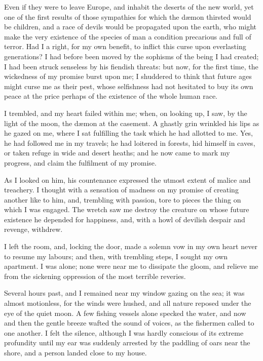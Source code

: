 Even if they were to leave Europe,
and inhabit the deserts of the new
world, yet one of the first results of
those sympathies for which the dæmon
thirsted would be children, and a race
of devils would be propagated upon the
earth, who might make the very existence
of the species of man a condition
precarious and full of terror. Had
I a right, for my own benefit, to inflict
this curse upon everlasting generations?
I had before been moved
by the sophisms of the being I had
created; I had been struck senseless
by his fiendish threats: but now, for
the first time, the wickedness of my
promise burst upon me; I shuddered
to think that future ages might curse
me as their pest, whose selfishness had
not hesitated to buy its own peace at
the price perhaps of the existence of
the whole human race.

I trembled, and my heart failed within
me; when, on looking up, I saw, by
the light of the moon, the dæmon at
the casement. A ghastly grin wrinkled
his lips as he gazed on me, where I sat
fulfilling the task which he had allotted
to me. Yes, he had followed me in my
travels; he had loitered in forests, hid
himself in caves, or taken refuge in
wide and desert heaths; and he now
came to mark my progress, and claim
the fulfilment of my promise.

As I looked on him, his countenance
expressed the utmost extent of malice
and treachery. I thought with a sensation
of madness on my promise of
creating another like to him, and, trembling
with passion, tore to pieces the
thing on which I was engaged. The
wretch saw me destroy the creature on
whose future existence he depended for
happiness, and, with a howl of devilish
despair and revenge, withdrew.

I left the room, and, locking the
door, made a solemn vow in my own
heart never to resume my labours; and
then, with trembling steps, I sought my
own apartment. I was alone; none
were near me to dissipate the gloom,
and relieve me from the sickening oppression
of the most terrible reveries.

Several hours past, and I remained
near my window gazing on the sea; it
was almost motionless, for the winds
were hushed, and all nature reposed
under the eye of the quiet moon. A
few fishing vessels alone specked the
water, and now and then the gentle
breeze wafted the sound of voices, as
the fishermen called to one another.
I felt the silence, although I was hardly
conscious of its extreme profundity
until my ear was suddenly arrested by
the paddling of oars near the shore,
and a person landed close to my house.

